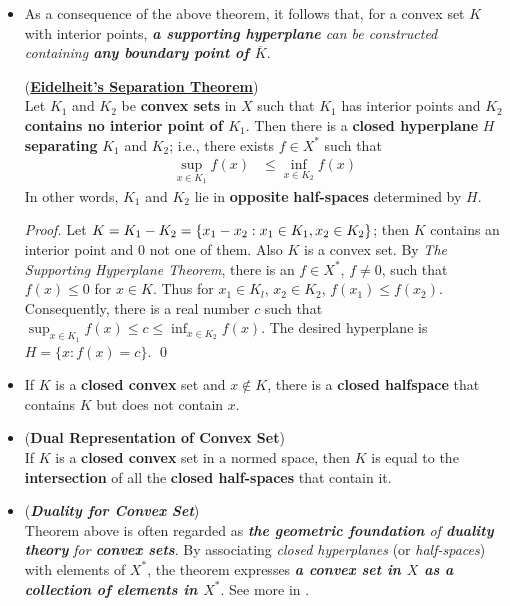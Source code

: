 \documentclass[11pt]{article}
\begin{document}
\begin{itemize}
\item As a consequence of the above theorem, it follows that, for a convex set $K$ with interior points, \emph{\textbf{a supporting hyperplane} can be constructed
containing \textbf{any boundary point of $\overline{K}$}}.
\begin{theorem} (\underline{\textbf{Eidelheit's Separation Theorem}})  \citep{luenberger1997optimization, rockafellar1970convex} \\
Let $K_1$ and $K_2$ be \textbf{convex sets} in $X$ such that $K_1$ has interior points and $K_2$ \textbf{contains no interior point of $K_1$}.
Then there is a \textbf{closed hyperplane} $H$ \textbf{separating} $K_1$ and $K_2$; i.e., there exists $f \in X^{*}$ such that 
\begin{align}
\sup_{x \in K_1}f(x) &\le \inf_{x \in K_2}f(x) \label{eqn: convex_duality_weak}
\end{align}
In other words, $K_1$ and $K_2$ lie in \textbf{opposite} \textbf{half-spaces} determined by $H$.
\end{theorem}
\begin{proof}
Let $K = K_1 - K_2 = \left\{x_1 - x_2: x_1 \in K_1, x_2 \in K_2\right\}$; then $K$ contains an interior point and $0$ not one of them. Also $K$ is a convex set. By \emph{The Supporting Hyperplane Theorem},  there is an $f \in X^{*}$, $f \neq 0$, such that $f(x) \le 0$ for $x \in K$. Thus for $x_1 \in K_l$, $x_2 \in K_2$, $f(x_1) \le f(x_2)$. Consequently, there is a real number $c$ such that $\sup_{x \in K_1}f(x) \le c \le \inf_{x \in K_2}f(x)$. The desired hyperplane is $H = \{x:  f(x) = c\}$.  \qed
\end{proof}

\item \begin{corollary}
If $K$ is a \textbf{closed convex} set and $x \not\in K$, there is a \textbf{closed halfspace} that contains $K$ but does not contain $x$.
\end{corollary}

\item \begin{theorem} (\textbf{Dual Representation of Convex Set})\citep{luenberger1997optimization, rockafellar1970convex} \\
If $K$ is a \textbf{closed convex} set in a normed space, then $K$ is equal to the \textbf{intersection} of all the \textbf{closed half-spaces} that contain it. 
\end{theorem}

\item \begin{remark} (\emph{\textbf{Duality for Convex Set}})\\
Theorem above is often regarded as \emph{\textbf{the geometric foundation} of \textbf{duality theory} for \textbf{convex sets}}. By associating \emph{closed hyperplanes} (or \textit{half-spaces}) with elements of $X^{*}$, the theorem expresses \emph{\textbf{a convex set in $X$ as a collection of elements in $X^{*}$}}. See more in \citep{rockafellar1970convex}.
\end{remark}


\end{itemize}
\end{document}
